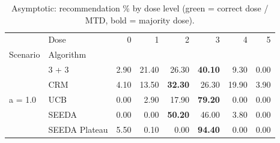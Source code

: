 \begin{table}[H]
\centering
\caption{Asymptotic: recommendation \% by dose level (green = correct dose / MTD, bold = majority dose).}
\label{tab:asym_rec_by_dose}
\begin{tabular}{llrrrrrr}
\toprule
 & Dose & 0 & 1 & 2 & 3 & 4 & 5 \\
Scenario & Algorithm &  &  &  &  &  &  \\
\midrule
\multirow[c]{5}{*}{a = 1.0} & 3 + 3 & 2.90 & 21.40 & {\cellcolor[HTML]{C8E6C9}} 26.30 & \bfseries 40.10 & 9.30 & 0.00 \\
 & CRM & 4.10 & 13.50 & {\cellcolor[HTML]{C8E6C9}} \bfseries 32.30 & 26.30 & 19.90 & 3.90 \\
 & UCB & 0.00 & 2.90 & {\cellcolor[HTML]{C8E6C9}} 17.90 & \bfseries 79.20 & 0.00 & 0.00 \\
 & SEEDA & 0.00 & 0.00 & {\cellcolor[HTML]{C8E6C9}} \bfseries 50.20 & 46.00 & 3.80 & 0.00 \\
 & SEEDA Plateau & 5.50 & 0.10 & {\cellcolor[HTML]{C8E6C9}} 0.00 & \bfseries 94.40 & 0.00 & 0.00 \\
\bottomrule
\end{tabular}
\end{table}
